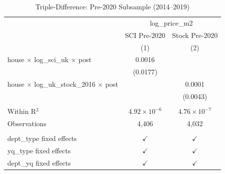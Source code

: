 
\begin{table}[htbp]
   \caption{\label{tab:prepost} Triple-Difference: Pre-2020 Subsample (2014--2019)}
   \bigskip
   \centering
   \begin{tabular}{lcc}
      \toprule
       & \multicolumn{2}{c}{log\_price\_m2}\\
                                                             & SCI Pre-2020          & Stock Pre-2020 \\   
                                                             & (1)                   & (2)\\  
      \midrule 
      house $\times$ log\_sci\_uk $\times$ post              & 0.0016                &   \\   
                                                             & (0.0177)              &   \\   
      house $\times$ log\_uk\_stock\_2016 $\times$ post      &                       & 0.0001\\   
                                                             &                       & (0.0043)\\   
       \\
      Within R$^2$                                           & $4.92\times 10^{-6}$  & $4.76\times 10^{-7}$\\   
      Observations                                           & 4,406                 & 4,032\\  
       \\
      dept\_type fixed effects                               & $\checkmark$          & $\checkmark$\\   
      yq\_type fixed effects                                 & $\checkmark$          & $\checkmark$\\   
      dept\_yq fixed effects                                 & $\checkmark$          & $\checkmark$\\   
      \bottomrule
   \end{tabular}
\end{table}


